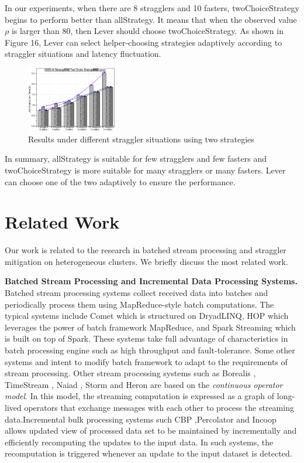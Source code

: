 \documentclass[10pt,conference,compsocconf,letterpaper]{IEEEtran}
\begin{document}
  In our experiments, when there are 8 stragglers and 10 fasters, twoChoiceStrategy begins to perform better than allStrategy. It means that when the observed value $\rho$ is larger than 80, then Lever should choose twoChoiceStrategy. As shown in Figure 16, Lever can select helper-choosing strategies adaptively according to straggler situations and latency fluctuation.
  \begin{figure}[htbp]
    \centering
    \includegraphics[width=0.35\textwidth]{FigureAllorTwo}
    \caption{Results under different straggler situations using two strategies}
    \label{Fig. 16:}
  \end{figure}

  In summary, allStrategy is suitable for few stragglers and few fasters and twoChoiceStrategy is more suitable for many stragglers or many fasters. Lever can choose one of the two adaptively to ensure the performance.

\section{Related Work}

  Our work is related to the research in batched stream processing and straggler mitigation on heterogeneous clusters. We briefly discuss the most related work.

  \textbf{Batched Stream Processing and Incremental Data Processing Systems.} Batched stream processing systems collect received data into batches and periodically process them using MapReduce-style batch computations. The typical systems include Comet \cite{He2010} which is structured on DryadLINQ, HOP \cite{Condie2010} which leverages the power of batch framework MapReduce, and Spark Streaming \cite{Zaharia2013} which is built on top of Spark. These systems take full advantage of characteristics in batch processing engine such as high throughput and fault-tolerance. Some other systems \cite{Li2011} and \cite{Lam2012} intent to modify batch framework to adapt to the requirements of stream processing. Other stream processing systems such as Borealis \cite{Abadi2005}, TimeStream \cite{Qian2013}, Naiad \cite{Murray2013}, Storm \cite{Toshniwal2014} and Heron \cite{Kulkarni2015} are based on the \emph{continuous operator model}. In this model, the streaming computation is expressed as a graph of long-lived operators that exchange messages with each other to process the streaming data.Incremental bulk processing systems such CBP \cite{Logothetis2010},Percolator \cite{Peng2010} and Incoop \cite{Bhatotia2011a} allows updated view of processed data set to be maintained by incrementally and efficiently recomputing the updates to the input data. In such systems, the recomputation is triggered whenever an update to the input dataset is detected.
\end{document}
